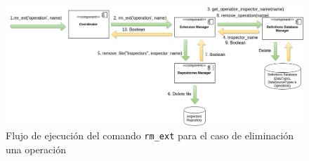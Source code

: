 \begin{figure}[H]
    \begin{center}
        \includegraphics[width=\textwidth]{figures/rm_ext}
        \caption{Flujo de ejecución del comando \texttt{rm\_ext} para el caso de eliminación una operación}
    \end{center}
\end{figure}

